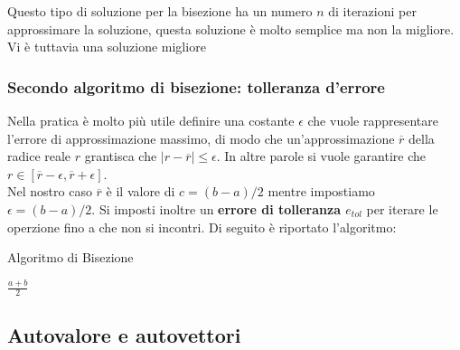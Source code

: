 Questo tipo di soluzione per la bisezione ha un numero $n$ di iterazioni per approssimare la soluzione, questa soluzione è molto semplice ma non la migliore. Vi è tuttavia una soluzione migliore

\subsubsection{Secondo algoritmo di bisezione: tolleranza d'errore}
Nella pratica è molto più utile definire una costante $\epsilon$ che vuole rappresentare l'errore di approssimazione massimo, di modo che un'approssimazione $\overline{r}$ della radice reale $r$ grantisca che $|r- \overline{r}| \leq \epsilon$. In altre parole si vuole garantire che $r\in [\overline{r}-\epsilon,\overline{r}+\epsilon]$. \\ Nel nostro caso $\overline{r}$ è il valore di $c=(b-a)/2$ mentre impostiamo $\epsilon = (b-a)/2$. Si imposti inoltre un \textbf{errore di tolleranza $e_{tol}$}  per iterare le operzione fino a che non si incontri. Di seguito è riportato l'algoritmo:

\begin{algorithm}
    \caption{Algoritmo di Bisezione}
    \Return $\frac{a + b}{2}$\; 
\end{algorithm}


\subsection{Autovalore e autovettori}
